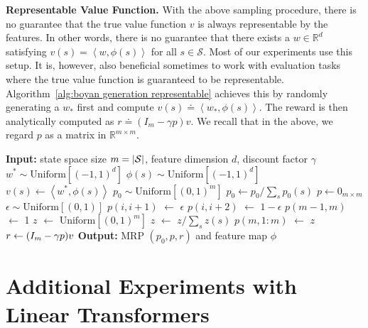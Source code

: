 \documentclass{article}
\newcommand{\fS}{\mathcal{S}}
\newcommand{\R}{\mathbb{R}}
\newcommand{\tb}[1]{{\textbf{#1}}}
\newcommand{\indot}[2]{{\left<#1, #2\right>}}
\newcommand{\uniform}[1]{{\text{Uniform}\left[#1\right]}}
\begin{document}
\tb{Representable Value Function.}
With the above sampling procedure,
there is no guarantee that the true value function $v$ is always representable by the features.
In other words,
there is no guarantee that there exists a $w \in \R^d$ satisfying $v(s) = \indot{w}{\phi(s)}$ for all $s \in \fS$.
Most of our experiments use this setup.
It is,
however,
also beneficial sometimes to work with evaluation tasks where the true value function is guaranteed to be representable.
Algorithm~\ref{alg:boyan generation representable} achieves this by randomly generating a $w_*$ first and compute $v(s) \doteq \indot{w_*}{\phi(s)}$.
The reward is then analytically computed as $r \doteq (I_m - \gamma p) v$.
We recall that in the above, we regard $p$ as a matrix in $\R^{m \times m}$.
\begin{algorithm}[h]
    \caption{Boyan Chain MRP and Feature Generation (Representable)} \label{alg:boyan generation representable}
    \begin{algorithmic}[1]
    \STATE \textbf{Input:} state space size $m = \abs{\fS}$, feature dimension $d$, discount factor $\gamma$
    \STATE $w^* \sim \uniform{(-1, 1)^d}$ 
    \FOR{$s \in \fS$}
    \STATE $\phi(s) \sim \uniform{(-1, 1)^d}$
    \STATE $v(s) \gets \indot{w^*}{\phi(s)}$ 
    \ENDFOR
    \STATE $p_0 \sim \uniform{(0, 1)^m}$ 
    \STATE $p_0 \gets p_0 /\sum_s p_0(s)$
    \STATE $p \gets 0_{m \times m}$ 
        \STATE $\epsilon \sim \uniform{(0, 1)}$
        \STATE $p(i, i+1)$ $\gets$ $\epsilon$
        \STATE $p(i, i+2)$ $\gets$ $1 - \epsilon$
    \ENDFOR
    \STATE $p(m-1, m)$ $\gets$ 1
    \STATE $z$ $\gets$ $\uniform{(0, 1)^m}$
    \STATE $z$ $\gets$ $z/\sum_s z(s)$
    \STATE $p(m, 1:m)$ $\gets$ $z$
    \STATE $r \gets \qty(I_m - \gamma p)v$ 
    \STATE \textbf{Output:} MRP $(p_0, p, r)$ and feature map $\phi$
    \end{algorithmic}
\end{algorithm}
\newpage
\section{Additional Experiments with Linear Transformers} \label{appendix: additional linear}
\end{document}

